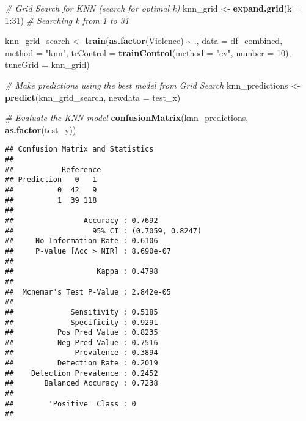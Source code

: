 \documentclass[
]{article}
\newenvironment{Shaded}{\begin{snugshade}}{\end{snugshade}}
\newcommand{\AttributeTok}[1]{\textcolor[rgb]{0.13,0.29,0.53}{#1}}
\newcommand{\CommentTok}[1]{\textcolor[rgb]{0.56,0.35,0.01}{\textit{#1}}}
\newcommand{\DecValTok}[1]{\textcolor[rgb]{0.00,0.00,0.81}{#1}}
\newcommand{\FunctionTok}[1]{\textcolor[rgb]{0.13,0.29,0.53}{\textbf{#1}}}
\newcommand{\NormalTok}[1]{#1}
\newcommand{\OtherTok}[1]{\textcolor[rgb]{0.56,0.35,0.01}{#1}}
\newcommand{\SpecialCharTok}[1]{\textcolor[rgb]{0.81,0.36,0.00}{\textbf{#1}}}
\newcommand{\StringTok}[1]{\textcolor[rgb]{0.31,0.60,0.02}{#1}}
\begin{document}
\begin{Shaded}
\begin{Highlighting}[]
\CommentTok{\# Grid Search for KNN (search for optimal \textquotesingle{}k\textquotesingle{})}
\NormalTok{knn\_grid }\OtherTok{\textless{}{-}} \FunctionTok{expand.grid}\NormalTok{(}\AttributeTok{k =} \DecValTok{1}\SpecialCharTok{:}\DecValTok{31}\NormalTok{)  }\CommentTok{\# Searching k from 1 to 31}

\NormalTok{knn\_grid\_search }\OtherTok{\textless{}{-}} \FunctionTok{train}\NormalTok{(}\FunctionTok{as.factor}\NormalTok{(Violence) }\SpecialCharTok{\textasciitilde{}}\NormalTok{ ., }\AttributeTok{data =}\NormalTok{ df\_combined, }
                         \AttributeTok{method =} \StringTok{"knn"}\NormalTok{, }
                         \AttributeTok{trControl =} \FunctionTok{trainControl}\NormalTok{(}\AttributeTok{method =} \StringTok{"cv"}\NormalTok{, }\AttributeTok{number =} \DecValTok{10}\NormalTok{), }
                         \AttributeTok{tuneGrid =}\NormalTok{ knn\_grid)}

\CommentTok{\# Make predictions using the best model from Grid Search}
\NormalTok{knn\_predictions }\OtherTok{\textless{}{-}} \FunctionTok{predict}\NormalTok{(knn\_grid\_search, }\AttributeTok{newdata =}\NormalTok{ test\_x)}

\CommentTok{\# Evaluate the KNN model}
\FunctionTok{confusionMatrix}\NormalTok{(knn\_predictions, }\FunctionTok{as.factor}\NormalTok{(test\_y))}
\end{Highlighting}
\end{Shaded}

\begin{verbatim}
## Confusion Matrix and Statistics
## 
##           Reference
## Prediction   0   1
##          0  42   9
##          1  39 118
##                                           
##                Accuracy : 0.7692          
##                  95% CI : (0.7059, 0.8247)
##     No Information Rate : 0.6106          
##     P-Value [Acc > NIR] : 8.690e-07       
##                                           
##                   Kappa : 0.4798          
##                                           
##  Mcnemar's Test P-Value : 2.842e-05       
##                                           
##             Sensitivity : 0.5185          
##             Specificity : 0.9291          
##          Pos Pred Value : 0.8235          
##          Neg Pred Value : 0.7516          
##              Prevalence : 0.3894          
##          Detection Rate : 0.2019          
##    Detection Prevalence : 0.2452          
##       Balanced Accuracy : 0.7238          
##                                           
##        'Positive' Class : 0               
## 
\end{verbatim}
\end{document}
